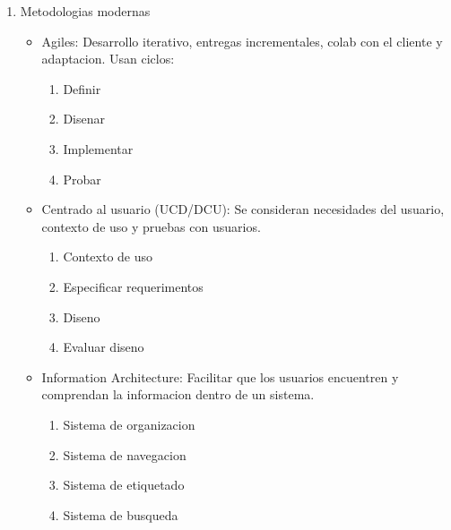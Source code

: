 \documentclass[11pt]{article}
\begin{document}
\begin{enumerate}
\begin{enumerate}
\begin{itemize}
\item Web Modeling Language (WebML)
\begin{itemize}
\item Para aplicaciones web basada en modelos.
\begin{itemize}
\item Modelo de datos: Entidades y relaciones.
\item Modelo de estructura: Paginas del sitio.
\item Modelo de navegacion: Enlaces entre paginas.
\item Modelo de presentacion: Presentacion de los contenidos.
\end{itemize}
\end{itemize}
\end{itemize}
\item Metodologias modernas
\label{sec:org1c7f32b}
\begin{itemize}
\item Agiles: Desarrollo iterativo, entregas incrementales, colab con el cliente y adaptacion. Usan ciclos:
\begin{enumerate}
\item Definir
\item Disenar
\item Implementar
\item Probar
\end{enumerate}

\item Centrado al usuario (UCD/DCU): Se consideran necesidades del usuario, contexto de uso y pruebas con usuarios.
\begin{enumerate}
\item Contexto de uso
\item Especificar requerimentos
\item Diseno
\item Evaluar diseno
\end{enumerate}

\item Information Architecture: Facilitar que los usuarios encuentren y comprendan la informacion dentro de un sistema.
\begin{enumerate}
\item Sistema de organizacion
\item Sistema de navegacion
\item Sistema de etiquetado
\item Sistema de busqueda
\end{enumerate}
\end{itemize}
\end{enumerate}
\end{enumerate}
\end{document}
